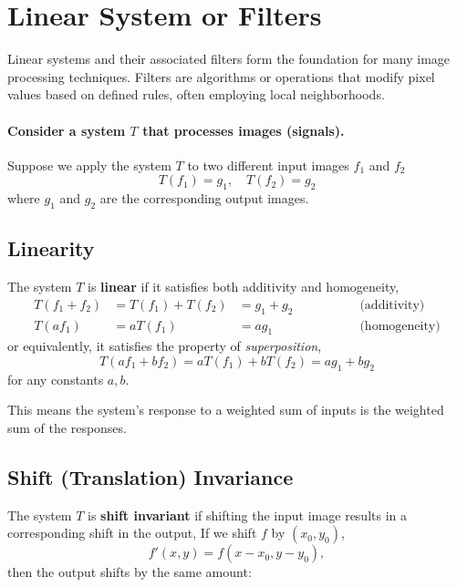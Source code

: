 \section{Linear System or Filters}
\label{lec_02_sec_03}

Linear systems and their associated filters form the foundation for many image processing techniques. Filters are algorithms or operations that modify pixel values based on defined rules, often employing local neighborhoods.

\paragraph{Consider a system \( T \) that processes images (signals).}

Suppose we apply the system \( T \) to two different input images \( f_1 \) and \( f_2 \)
\[
T(f_1) = g_1, \quad T(f_2) = g_2
\]
where \( g_1 \) and \( g_2 \) are the corresponding output images.

\subsection{Linearity}
The system \( T \) is \textbf{linear} if it satisfies both additivity and homogeneity, 
\begin{align*}
T(f_1 + f_2) &= T(f_1) + T(f_2) &= g_1 + g_2 \qquad \qquad &\text{(additivity)} \\
T(a f_1) &= a T(f_1) &= a g_1  \qquad \qquad \qquad  &\text{(homogeneity)} 
\end{align*}
or equivalently, it satisfies the property of \textit{superposition},
\[
T(a f_1 + b f_2) = a T(f_1) + b T(f_2) = a g_1 + b g_2
\]
for any constants \( a, b \).

This means the system's response to a weighted sum of inputs is the weighted sum of the responses.


\subsection{Shift (Translation) Invariance}

The system \( T \) is \textbf{shift invariant} if shifting the input image results in a corresponding shift in the output, If we shift \( f \) by \((x_0,y_0)\),
\[
f'(x,y) = f(x - x_0, y - y_0),
\]
then the output shifts by the same amount:

